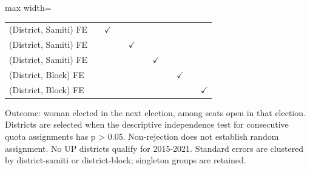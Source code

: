 \begin{adjustbox}{max width=\linewidth}
\begin{threeparttable}[b]
\begin{tabular}{lcccccccccc}
          \\
         (District, Samiti) FE  &         & $\checkmark$  &        &               &        &               &              &               &        & \\  
         (District, Samiti) FE  &         &               &        & $\checkmark$  &        &               &              &               &        & \\  
         (District, Samiti) FE  &         &               &        &               &        & $\checkmark$  &              &               &        & \\  
         (District, Block) FE   &         &               &        &               &        &               &              & $\checkmark$  &        & \\  
         (District, Block) FE   &         &               &        &               &        &               &              &               &        & $\checkmark$\\   
         \bottomrule
      \end{tabular}
      
      \begin{tablenotes}
         \item Outcome: woman elected in the next election, among seats open in that election. Districts are selected when the descriptive independence test for consecutive quota assignments has p > 0.05. Non-rejection does not establish random assignment. No UP districts qualify for 2015-2021. Standard errors are clustered by district-samiti or district-block; singleton groups are retained.
      \end{tablenotes}
   \end{threeparttable}
\end{adjustbox}
\par\endgroup


